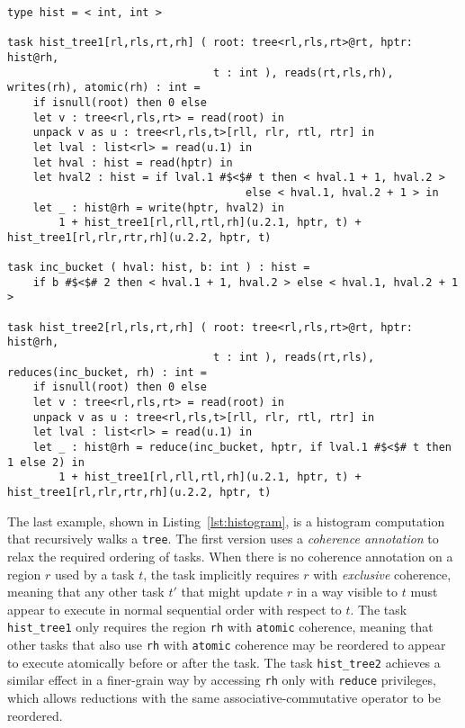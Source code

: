 \begin{lstlisting}[label={lst:histogram},caption={Histogram with Reductions and Atomic Coherence}]
type hist = < int, int >

task hist_tree1[rl,rls,rt,rh] ( root: tree<rl,rls,rt>@rt, hptr: hist@rh, 
                                t : int ), reads(rt,rls,rh), writes(rh), atomic(rh) : int =
    if isnull(root) then 0 else
    let v : tree<rl,rls,rt> = read(root) in
    unpack v as u : tree<rl,rls,t>[rll, rlr, rtl, rtr] in
    let lval : list<rl> = read(u.1) in
    let hval : hist = read(hptr) in
    let hval2 : hist = if lval.1 #$<$# t then < hval.1 + 1, hval.2 >
                                     else < hval.1, hval.2 + 1 > in
    let _ : hist@rh = write(hptr, hval2) in
        1 + hist_tree1[rl,rll,rtl,rh](u.2.1, hptr, t) + hist_tree1[rl,rlr,rtr,rh](u.2.2, hptr, t)

task inc_bucket ( hval: hist, b: int ) : hist =
    if b #$<$# 2 then < hval.1 + 1, hval.2 > else < hval.1, hval.2 + 1 >

task hist_tree2[rl,rls,rt,rh] ( root: tree<rl,rls,rt>@rt, hptr: hist@rh, 
                                t : int ), reads(rt,rls), reduces(inc_bucket, rh) : int =
    if isnull(root) then 0 else
    let v : tree<rl,rls,rt> = read(root) in
    unpack v as u : tree<rl,rls,t>[rll, rlr, rtl, rtr] in
    let lval : list<rl> = read(u.1) in
    let _ : hist@rh = reduce(inc_bucket, hptr, if lval.1 #$<$# t then 1 else 2) in
        1 + hist_tree1[rl,rll,rtl,rh](u.2.1, hptr, t) + hist_tree1[rl,rlr,rtr,rh](u.2.2, hptr, t)
\end{lstlisting}

The last example, shown in Listing~\ref{lst:histogram}, is a histogram
computation that recursively walks a {\tt tree}.  The first version 
uses a {\em coherence annotation} to relax the
required ordering of tasks.  When there is no coherence annotation on
a region $r$ used by a task $t$, the task implicitly requires $r$
with {\em exclusive} coherence, meaning that any other task $t'$ that might
update $r$ in a way visible to $t$ must appear to execute in normal sequential
order with respect to $t$.  The task {\tt hist\_tree1} only requires the region {\tt rh}
with {\tt atomic} coherence, meaning that other tasks that also use {\tt rh} with {\tt atomic} coherence
may be reordered to appear to execute atomically before or after the task.  The task {\tt hist\_tree2} achieves
a similar effect in a finer-grain way by accessing {\tt rh} only with {\tt reduce} privileges, which allows reductions
with the same associative-commutative operator to be reordered.


